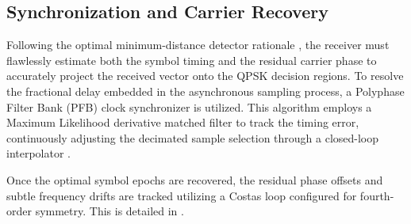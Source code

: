 \subsection{Synchronization and Carrier Recovery}

Following the optimal minimum-distance detector rationale \autocite{Proakis2007}, the receiver must flawlessly estimate both the symbol timing and the residual carrier phase to accurately project the received vector onto the QPSK decision regions. To resolve the fractional delay embedded in the asynchronous sampling process, a Polyphase Filter Bank (PFB) clock synchronizer is utilized. This algorithm employs a Maximum Likelihood derivative matched filter to track the timing error, continuously adjusting the decimated sample selection through a closed-loop interpolator \autocite{Artes2007}.

Once the optimal symbol epochs are recovered, the residual phase offsets and subtle frequency drifts are tracked utilizing a Costas loop configured for fourth-order symmetry. This is detailed in .




